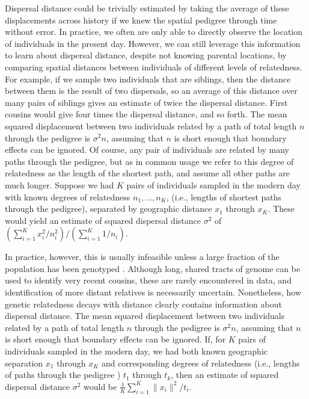 \documentclass{ar-1col}
\newcommand{\plr}[1]{{\color{green}{#1}}}
\begin{document}
Dispersal distance could be trivially estimated by taking
the average of these displacements across history
if we knew the spatial pedigree through time without error.
In practice, we often are only able to directly observe
the location of individuals in the present day.
However, we can still leverage this information to learn about dispersal distance,
despite not knowing parental locations, 
by comparing spatial distances between individuals of different levels of relatedness.
For example, if we sample two individuals that are siblings,
then the distance between them is the result of two dispersals,
so an average of this distance over many pairs of siblings 
gives an estimate of twice the dispersal distance.
First cousins would give four times the dispersal distance, and so forth.
The mean squared displacement between two individuals
related by a path of total length $n$ through the pedigree is $\sigma^2 n$,
assuming that $n$ is short enough that boundary effects can be ignored.
Of course, any pair of individuals are related by many paths through the pedigree,
but as in common usage we refer to this degree of relatedness
as the length of the shortest path,
and assume all other paths are much longer.
Suppose we had $K$ pairs of individuals sampled in the modern day
with known degrees of relatedness $n_1, \ldots, n_K$,
(i.e., lengths of shortest paths through the pedigree),
separated by geographic distance $x_1$ through $x_K$.
These would yield an estimate of squared dispersal distance $\sigma^2$ of
$(\sum_{i=1}^K x_i^2 / n_i^2) / (\sum_{i=1}^K 1 / n_i)$.

In practice, however, this is usually infeasible
unless a large fraction of the population has been genotyped
\citep[e.g.,][]{Aguillon2017deconstructing}.
Although long, shared tracts of genome can be used to identify very recent cousins,
these are rarely encountered in data,
and identification of more distant relatives is necessarily uncertain.
Nonetheless, how genetic relatedness decays with distance
clearly contains information about dispersal distance.
The mean squared displacement between two individuals
related by a path of total length $n$ through the pedigree
is $\sigma^2 n$,
assuming that $n$ is short enough that boundary effects can be ignored.
If, for $K$ pairs of individuals sampled in the modern day,
we had both known geographic separation $x_1$ through $x_K$
and corresponding degrees of relatedness 
(i.e., lengths of paths through the pedigree \plr{fixme})
$t_1$ through $t_k$,
then an estimate of squared dispersal distance $\sigma^2$ would be
$\frac{1}{K}\sum_{i=1}^K \|x_i\|^2 / t_i$.
\end{document}
